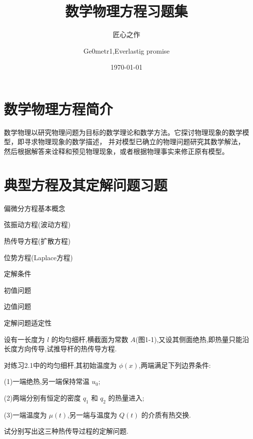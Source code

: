 \documentclass[color=blue,lang=cn,newtx,10pt,scheme=chinese]{elegantbook}
\title{数学物理方程习题集}
\subtitle{匠心之作}
\author{Ge0metr1,Everlastig promise}
\institute{NUAA}
\date{\today}
\begin{document}
\maketitle
\frontmatter

\tableofcontents

\mainmatter

\chapter{数学物理方程简介}%

数学物理以研究物理问题为目标的数学理论和数学方法。它探讨物理现象的数学模型，即寻求物理现象的数学描述，
并对模型已确立的物理问题研究其数学解法，然后根据解答来诠释和预见物理现象，或者根据物理事实来修正原有模型。




\chapter{典型方程及其定解问题习题}%

\begin{introduction}
  \item 偏微分方程基本概念
  \item 弦振动方程(波动方程)
  \item 热传导方程(扩散方程)
  \item 位势方程(Laplace方程)
  \item 定解条件
  \item 初值问题
  \item 边值问题
  \item 定解问题适定性
\end{introduction}
\quad

\begin{exercise}
设有一长度为 $l$ 的均匀细杆,横截面为常数 $A$(图1-1),又设其侧面绝热,即热量只能沿长度方向传导,试推导杆的热传导方程.
\end{exercise}
\quad

\begin{solution}
  
\end{solution}
  
\quad

\begin{exercise}
对练习2.1中的均匀细杆,其初始温度为 $\phi (x)$,两端满足下列边界条件:

(1)一端绝热,另一端保持常温 $u_0$;

(2)两端分别有恒定的密度 $q_1$ 和 $q_2$ 的热量进入;

(3)一端温度为 $\mu (t)$,另一端与温度为 $Q(t)$ 的介质有热交换.

试分别写出这三种热传导过程的定解问题.
\end{exercise}
\quad
\end{document}
